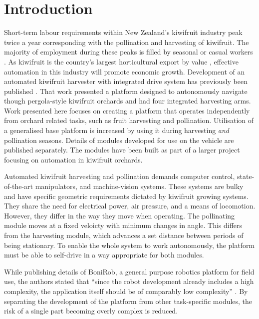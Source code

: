 \documentclass[preprint,authoryear,12pt]{elsarticle}
\begin{document}
\section{Introduction}
\label{sect:intro}
    Short-term labour requirements within New Zealand's kiwifruit industry peak twice a year corresponding with the pollination and harvesting of kiwifruit.
    The majority of employment during these peaks is filled by seasonal or casual workers \citep{Timmins2009}.
    As kiwifruit is the country's largest horticultural export by value \citep{StatisticsNewZealand2015}, effective automation in this industry will promote economic growth.
    Development of an automated kiwifruit harvester with integrated drive system has previously been published \citep{Scarfe2012}.
    That work presented a platform designed to autonomously navigate though pergola-style kiwifruit orchards and had four integrated harvesting arms.
    Work presented here focuses on creating a platform that operates independently from orchard related tasks, such as fruit harvesting and pollination.
    Utilisation of a generalised base platform is increased by using it during harvesting \emph{and} pollination seasons.
    Details of modules developed for use on the vehicle are published separately.
    The modules have been built as part of a larger project focusing on automation in kiwifruit orchards.

    Automated kiwifruit harvesting and pollination demands computer control, state-of-the-art manipulators, and machine-vision systems.
    These systems are bulky and have specific geometric requirements dictated by kiwifruit growing systems.
    They share the need for electrical power, air pressure, and a means of locomotion.
    However, they differ in the way they move when operating.
    The pollinating module moves at a fixed veloicty with minimum changes in angle.
    This differs from the harvesting module, which advances a set distance between periods of being stationary.
    To enable the whole system to work autonomously, the platform must be able to self-drive in a way appropriate for both modules.

    While publishing details of BoniRob, a general purpose robotics platform for field use, the authors stated that ``since the robot development already includes a high complexity, the application itself should be of comparably low complexity'' \citep{Ruckelshausen2009}.
    By separating the development of the platform from other task-specific modules, the risk of a single part becoming overly complex is reduced.
\end{document}
